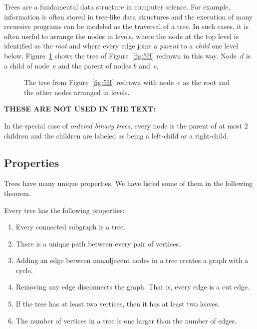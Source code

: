Trees are a fundamental data structure in computer science.  For
example, information is often stored in tree-like data structures and
the execution of many recursive programs can be modeled as the
traversal of a tree.  In such cases, it is often useful to arrange the
nodes in levels, where the node at the top level is identified as
the \emph{root} and where every edge joins a \emph{parent} to a
\emph{child} one level below.  Figure~\ref{fig:5JJ} shows the tree of
Figure~\ref{fig:5H} redrawn in this way.  Node~$d$ is a child of
node~$e$ and the parent of nodes $b$ and~$c$.

\begin{figure}


\caption{The tree from Figure~\ref{fig:5H} redrawn with node~$e$ as
  the root and the other nodes arranged in levels.}

\label{fig:5JJ}
\end{figure}

\begin{editingnotes}
\textbf{THESE ARE NOT USED IN THE TEXT:}

In the special case of \emph{ordered binary trees}, every node is the
parent of at most 2 children and the children are labeled as being a
left-child or a right-child.
\end{editingnotes}

\subsection{Properties}

Trees have many unique properties.  We have listed some of them in the
following theorem.

\begin{theorem}\label{th:treeprops}
Every tree has the following properties:

\begin{enumerate}

\item Every connected subgraph is a tree.\label{asub}

\item There is a unique path between every pair of vertices.\label{uniquepath}

\item Adding an edge between nonadjacent nodes in a tree creates a
  graph with a cycle.

\item Removing any edge disconnects the graph.  That is, every edge is
  a cut edge.

\item If the tree has at least two vertices, then it has at least two
  leaves.

\item The number of vertices in a tree is one larger than the number
  of edges.

\end{enumerate}
\end{theorem}

